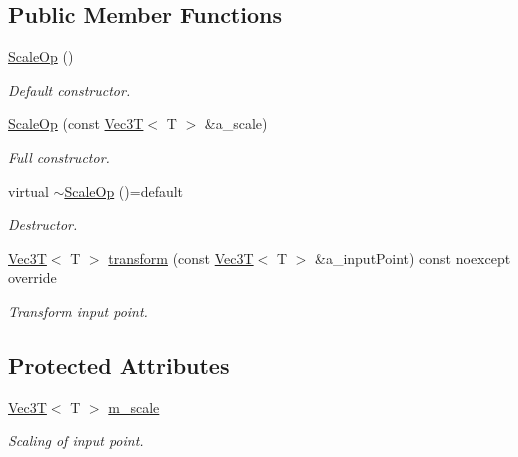\subsection*{Public Member Functions}
\begin{DoxyCompactItemize}
\item 
\mbox{\label{classScaleOp_aaa6d5841955e1b0a883bbcb5fdcbddc6}} 
\hyperlink{classScaleOp_aaa6d5841955e1b0a883bbcb5fdcbddc6}{Scale\+Op} ()
\begin{DoxyCompactList}\small\item\em Default constructor. \end{DoxyCompactList}\item 
\mbox{\label{classScaleOp_ab556ea0d0521a8a153e2406b1255014e}} 
\hyperlink{classScaleOp_ab556ea0d0521a8a153e2406b1255014e}{Scale\+Op} (const \hyperlink{classVec3T}{Vec3T}$<$ T $>$ \&a\+\_\+scale)
\begin{DoxyCompactList}\small\item\em Full constructor. \end{DoxyCompactList}\item 
\mbox{\label{classScaleOp_ab9fc71d00d7e0e339562edcaa2e3fc9a}} 
virtual \hyperlink{classScaleOp_ab9fc71d00d7e0e339562edcaa2e3fc9a}{$\sim$\+Scale\+Op} ()=default
\begin{DoxyCompactList}\small\item\em Destructor. \end{DoxyCompactList}\item 
\mbox{\label{classScaleOp_ac09e64516daa1b75111bd36dedfeeda9}} 
\hyperlink{classVec3T}{Vec3T}$<$ T $>$ \hyperlink{classScaleOp_ac09e64516daa1b75111bd36dedfeeda9}{transform} (const \hyperlink{classVec3T}{Vec3T}$<$ T $>$ \&a\+\_\+input\+Point) const noexcept override
\begin{DoxyCompactList}\small\item\em Transform input point. \end{DoxyCompactList}\end{DoxyCompactItemize}
\subsection*{Protected Attributes}
\begin{DoxyCompactItemize}
\item 
\mbox{\label{classScaleOp_aa9cdfff381b10970fd51eeb7e3e83188}} 
\hyperlink{classVec3T}{Vec3T}$<$ T $>$ \hyperlink{classScaleOp_aa9cdfff381b10970fd51eeb7e3e83188}{m\+\_\+scale}
\begin{DoxyCompactList}\small\item\em Scaling of input point. \end{DoxyCompactList}\end{DoxyCompactItemize}


